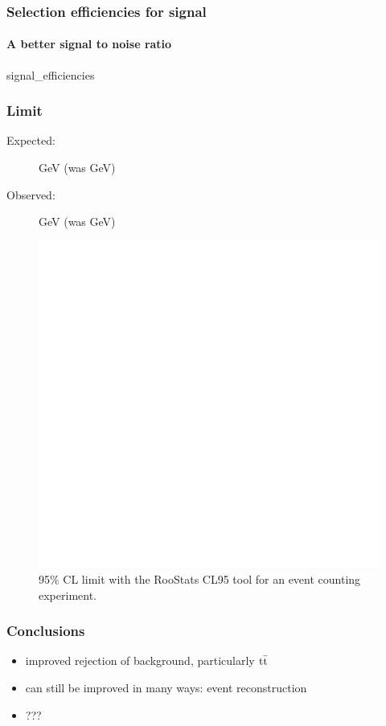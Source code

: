 \documentclass[ukenglish]{beamer}
\begin{document}
\begin{frame}
    \frametitle{Selection efficiencies for signal}
    \framesubtitle{A better signal to noise ratio}
    {signal_efficiencies}
\end{frame}

\begin{frame}
    \frametitle{Limit}
    \begin{description}
        \item[Expected:] \unit[658]{GeV} (was \unit[645]{GeV})
        \item[Observed:] \unit[633]{GeV} (was \unit[645]{GeV})
    \end{description}
    \begin{figure}[h]
        \centering
    \includegraphics[height=.7\textheight]{oLimit_limit_macro_4j_razor_tight_C.eps}
        \caption{95\% CL limit with the RooStats CL95 tool for an event
        counting experiment.}
    \end{figure}
\end{frame}

\begin{frame}
    \frametitle{Conclusions}
    \begin{itemize}
        \item improved rejection of background, particularly $\mathrm{t}\bar{\mathrm{t}}$
        \item can still be improved in many ways: event reconstruction
        \item ???
    \end{itemize}
\end{frame}
\end{document}
